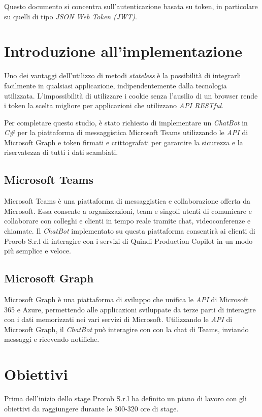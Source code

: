 \noindent Questo documento si concentra sull'autenticazione basata su token, in particolare su quelli di tipo \emph{JSON Web Token (JWT)}.


\section{Introduzione all'implementazione}
Uno dei vantaggi dell'utilizzo di metodi \emph{stateless} è la possibilità di integrarli facilmente in qualsiasi applicazione, indipendentemente dalla tecnologia utilizzata.
L'impossibilità di utilizzare i cookie senza l'ausilio di un browser rende i token la scelta migliore per applicazioni che utilizzano \emph{API RESTful}.

Per completare questo studio, è stato richiesto di implementare un \emph{ChatBot} in \emph{C\#} per la piattaforma di messaggistica Microsoft Teams utilizzando le \emph{API} di Microsoft Graph e token firmati e crittografati per garantire la sicurezza e la riservatezza di tutti i dati scambiati.

\subsection{Microsoft Teams}
Microsoft Teams è una piattaforma di messaggistica e collaborazione offerta da Microsoft.
Essa consente a organizzazioni, team e singoli utenti di comunicare e collaborare con colleghi e clienti in tempo reale tramite chat, videoconferenze e chiamate.
Il \emph{ChatBot} implementato su questa piattaforma consentirà ai clienti di Prorob S.r.l di interagire con i servizi di Quindi Production Copilot in un modo più semplice e veloce.

\subsection{Microsoft Graph}
Microsoft Graph è una piattaforma di sviluppo che unifica le \emph{API} di Microsoft 365 e Azure, permettendo alle applicazioni sviluppate da terze parti di interagire con i dati memorizzati nei vari servizi di Microsoft.
Utilizzando le \emph{API} di Microsoft Graph, il \emph{ChatBot} può interagire con con la chat di Teams, inviando messaggi e ricevendo notifiche.

\section{Obiettivi}
Prima dell'inizio dello stage Prorob S.r.l ha definito un piano di lavoro con gli obiettivi da raggiungere durante le 300-320 ore di stage. \\

